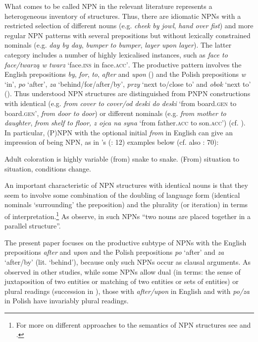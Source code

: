 \documentclass[output=paper]{langscibook}
\begin{document}
What comes to be called NPN in the relevant literature represents a heterogeneous inventory of structures. Thus, there are idiomatic NPNs with a restricted selection of different nouns (e.g. \textit{cheek by jowl}, \textit{hand over fist}) and more regular NPN patterns with several prepositions but without lexically constrained nominals (e.g. \textit{day by day}, \textit{bumper to bumper}, \textit{layer upon layer}). The latter category includes a number of highly lexicalised instances, such as \textit{face to face/twarzą w twarz} ‘face.\textsc{ins} in face.\textsc{acc’}. The productive pattern involves the English prepositions \textit{by}, \textit{for}, \textit{to}, \textit{after} and \textit{upon} (\citealt{Pi1995,Jackendoff2008}) and the Polish prepositions \textit{w} ‘in’, \textit{po} ‘after’, \textit{za} ‘behind/for/after/by’, \textit{przy} ‘next to/close to’ and \textit{obok} ‘next to’ (\citealt{Rosalska2011,Pskit2015,Dobaczewski2018}). Thus understood NPN structures are distinguished from PNPN constructions with identical (e.g. \textit{from cover to cover/od deski do deski} ‘from board.\textsc{gen} to board.\textsc{gen}’, \textit{from door to door}) or different nominals (e.g. \textit{from mother to daughter}, \textit{from shelf to floor, z ojca na syna }‘from father.\textsc{acc} to son.\textsc{acc}’) (cf. \citealt{Zwarts2013}). In particular, (P)NPN with the optional initial \textit{from} in English can give an impression of being NPN, as in \citeauthor{Jackendoff2008}’s (\citeyear{Jackendoff2008}: 12) examples below (cf. also \citealt{Zwarts2013}: 70):

\ea\label{psk:ex:1} \ea Adult coloration is highly variable (from) snake to snake.
\ex (From) situation to situation, conditions change.
\z\z

\noindent An important characteristic of NPN structures with identical nouns is that they seem to involve some combination of the doubling of language form (identical nominals ‘surrounding’ the preposition) and the plurality (or iteration) in terms of interpretation.\footnote{For more on different approaches to the semantics of NPN structures see \cite{Beck.Stechow2007} and \cite{Jackendoff2008}.} As \citet[280]{Quirk.etal1985} observe, in such NPNs “two nouns are placed together in a parallel structure”.

The present paper focuses on the productive subtype of NPNs with the English prepositions \textit{after} and \textit{upon} and the Polish prepositions \textit{po} ‘after’ and \textit{za} ‘after/by’ (lit. ‘behind’), because only such NPNs occur as clausal arguments. As observed in other studies, while some NPNs allow dual (in  terms: the sense of juxtaposition of two entities or matching of two entities or sets of entities) or plural readings (succession in \citealt{Jackendoff2008}), those with \textit{after/upon} in English and with \textit{po/za} in Polish have invariably plural readings.
\end{document}
